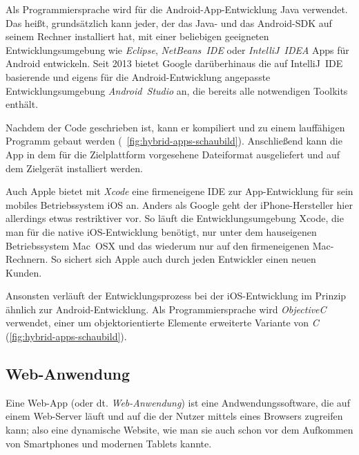 Als Programmiersprache wird für die Android-App-Entwicklung Java verwendet. Das heißt, grundsätzlich kann jeder, der das Java- und das Android-SDK auf seinem Rechner installiert hat, mit einer beliebigen geeigneten Entwicklungsumgebung wie \emph{Eclipse}, \emph{NetBeans~IDE} oder \emph{IntelliJ~IDEA} Apps für Android entwickeln. 
Seit 2013 bietet Google darüberhinaus die auf IntelliJ~IDE basierende und eigens für die Android-Entwicklung angepasste Entwicklungsumgebung \emph{Android~Studio} an,\cite{android-studio} die bereits alle notwendigen Toolkits enthält. 

Nachdem der Code geschrieben ist, kann er kompiliert und zu einem lauffähigen Programm gebaut werden (\seename\ \autoref{fig:hybrid-apps-schaubild}). Anschließend kann die App in dem für die Zielplattform vorgesehene Dateiformat ausgeliefert und auf dem Zielgerät installiert werden.

Auch Apple bietet mit \emph{Xcode} eine firmeneigene IDE zur App-Entwicklung für sein mobiles Betriebssystem iOS an. Anders als Google geht der iPhone-Hersteller hier allerdings etwas restriktiver vor. So läuft die Entwicklungsumgebung Xcode, die man für die native iOS-Entwicklung benötigt, nur unter dem hauseigenen Betriebssystem Mac~OSX und das wiederum nur auf den firmeneigenen Mac-Rechnern. So sichert sich Apple auch durch jeden Entwickler einen neuen Kunden.

Ansonsten verläuft der Entwicklungsprozess bei der iOS-Entwicklung im Prinzip ähnlich zur Android-Entwicklung. Als Programmiersprache wird \mbox{\emph{ObjectiveC}} verwendet, einer um objektorientierte Elemente erweiterte Variante von \emph{C} (\seename \autoref{fig:hybrid-apps-schaubild}).

\subsection{Web-Anwendung}

Eine Web-App (oder dt. \emph{Web-Anwendung}) ist eine Andwendungssoftware, die auf einem Web-Server läuft und auf die der Nutzer mittels eines Browsers zugreifen kann; also eine dynamische Website, wie man sie auch schon vor dem Aufkommen von Smartphones und modernen Tablets kannte. 

